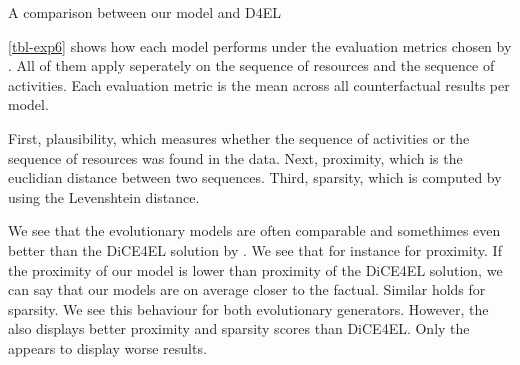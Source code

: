 \documentclass[./../../paper.tex]{subfiles}
\begin{document}
\begin{table}
    \centering    
    \resizebox{\linewidth}{!}{
        
        
    }
\caption{A comparison between our model and D4EL}
\label{tbl-exp6}
\end{table}

\autoref{tbl-exp6} shows how each model performs under the evaluation metrics chosen by \citeauthor{hsieh_DiCE4ELInterpretingProcess_2021}. All of them apply seperately on the sequence of resources and the sequence of activities. Each evaluation metric is the mean across all counterfactual results per model.

First, plausibility, which measures whether the sequence of activities or the sequence of resources was found in the data. Next, proximity, which is the euclidian distance between two sequences. Third, sparsity, which is computed by using the Levenshtein distance. 

We see that the evolutionary models are often comparable and somethimes even better than the DiCE4EL solution by \citeauthor{hsieh_DiCE4ELInterpretingProcess_2021}. We see that for instance for proximity. If the proximity of our model is lower than proximity of the DiCE4EL solution, we can say that our models are on average closer to the factual. Similar holds for sparsity. We see this behaviour for both evolutionary generators. However, the \ModelCBG also displays better proximity and sparsity scores than DiCE4EL. Only the \ModelRNG appears to display worse results. 





\end{document}
